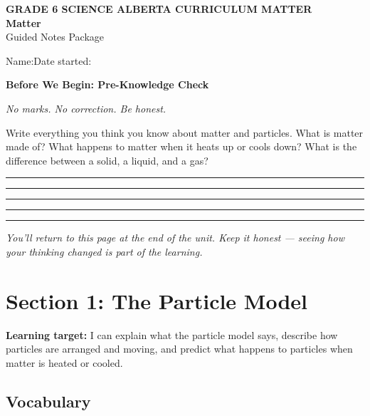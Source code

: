 \documentclass[11pt, a4paper]{article}
\newcommand{\blank}[1]{\underline{\hspace{#1}}}
\newcommand{\answerline}{\par\vspace{0.45cm}\noindent\rule{\linewidth}{0.4pt}\par\vspace{0.1cm}}
\begin{document}

\begin{tcolorbox}[colback=accentlight, colframe=accent, leftrule=5pt,
    toprule=0.6pt, bottomrule=0.6pt, rightrule=0.6pt,
    top=8pt, bottom=8pt, left=12pt]
  {\small\bfseries\color{accent}GRADE 6 SCIENCE
    \textperiodcentered{} ALBERTA CURRICULUM
    \textperiodcentered{} MATTER}\\[4pt]
  {\LARGE\bfseries Matter}\\[3pt]
  {\small\color{slate}Guided Notes Package}
\end{tcolorbox}
\vspace{6pt}
\noindent Name:\;\blank{6cm}\hfill Date started:\;\blank{4cm}
\vspace{14pt}

\begin{tcolorbox}[preknowledge]
\textbf{Before We Begin: Pre-Knowledge Check}

\smallskip
\textit{No marks. No correction. Be honest.}

\medskip
Write everything you think you know about matter and particles. What is matter made of? What happens to matter when it heats up or cools down? What is the difference between a solid, a liquid, and a gas?

\answerline\answerline\answerline\answerline\answerline

\smallskip
\textit{You'll return to this page at the end of the unit. Keep it honest --- seeing how your thinking changed is part of the learning.}
\end{tcolorbox}

\clearpage

\section{Section 1: The Particle Model}

\begin{tcolorbox}[learningtarget]
\textbf{Learning target:} I can explain what the particle model says, describe how particles are arranged and moving, and predict what happens to particles when matter is heated or cooled.
\end{tcolorbox}

\subsection{Vocabulary}
\end{document}
